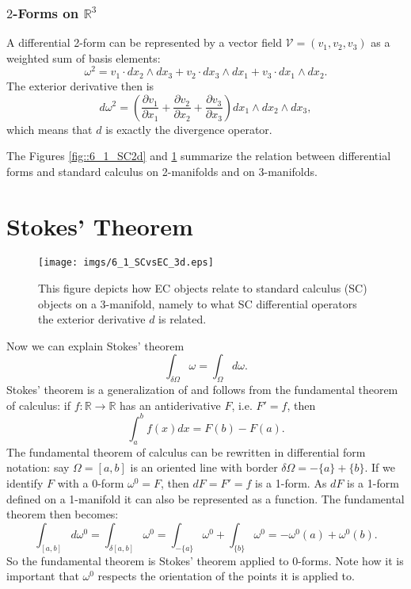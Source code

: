 \subsubsection{$2$-Forms on $\mathbb R^3$}
A differential 2-form can be represented by a vector field $\mathcal V = (v_1,v_2,v_3)$ as a weighted sum of basis elements:
\[\omega^2 = v_1\cdot dx_2 \wedge dx_3 + v_2 \cdot dx_3 \wedge dx_1 + v_3\cdot dx_1 \wedge dx_2.\]
The exterior derivative  then is
\[d \omega^2 = (\frac{\partial v_1}{\partial x_1} + \frac{\partial v_2}{\partial x_2} + \frac{\partial v_3}{\partial x_3})dx_1\wedge dx_2 \wedge dx_3,\]
which means that $d$ is exactly the divergence operator.

The Figures \ref{fig::6_1_SC2d} and  \ref{fig::6_1_SC3d} summarize the relation between differential forms and standard calculus on 2-manifolds and  on 3-manifolds.


\section{Stokes' Theorem}
\begin{figure}
\begin{center}
\texttt{[image: imgs/6\_1\_SCvsEC\_3d.eps]}
\end{center}
\caption{This figure depicts how EC objects relate to standard calculus (SC) objects on a 3-manifold, namely to what SC differential operators the exterior derivative $d$ is related.}
\label{fig::6_1_SC3d}
\end{figure}

\label{sec:EC_stokes}

Now we can explain Stokes' theorem
\[\int_{\delta\Omega} \omega = \int_{\Omega} d \omega.\]
Stokes' theorem is a generalization of and follows from the fundamental theorem of calculus: if $f:\mathbb R \to \mathbb R $ has an antiderivative $F$, i.e. $F' = f$, then
\[\int_a^b f(x) dx = F(b) - F(a).\]
The fundamental theorem of calculus can be rewritten in differential form notation: say $\Omega = [a,b]$ is an oriented line with border $\delta \Omega = -\{a\} + \{b\}$. If we identify $F$ with a 0-form $\omega^0 = F$, then $d F = F' =f$ is a 1-form. As $dF$ is a 1-form defined on a 1-manifold it can also be represented as a function. The fundamental theorem then becomes:
\[\int_{[a,b]} d\omega^0 = \int_{\delta [a,b]} \omega^0 = \int_{-\{a\}}\omega^0 + \int_{\{b\}} \omega^0 = -\omega^0(a) + \omega^0(b).\]
So the fundamental theorem is Stokes' theorem applied to $0$-forms. Note how it is important that $\omega^0$ respects the orientation of the points it is applied to.

